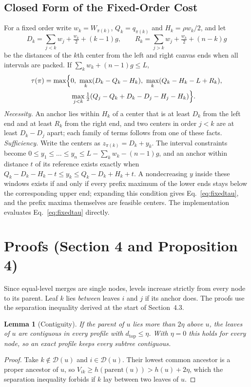 \documentclass[preprint]{vgtc}
\newtheorem{lemma}{Lemma}
\newcommand{\dtop}{d_{\mathrm{top}}}
\begin{document}
\subsection{Closed Form of the Fixed-Order Cost}\label{sec:tau}
For a fixed order write $w_k=W_{\pi(k)}$, $Q_k=q_{\pi(k)}$ and $H_k=\rho w_k/2$, and let
\begin{equation*}
D_k=\sum_{j<k}w_j+\tfrac{w_k}{2}+(k-1)g,\qquad R_k=\sum_{j>k}w_j+\tfrac{w_k}{2}+(n-k)g
\end{equation*}
be the distances of the $k$th center from the left and right canvas ends when all intervals are packed. If $\sum_kw_k+(n-1)g\le L$,
\begin{equation}\label{eq:fixedtau}
\begin{split}
\tau(\pi)=\max\Bigl\{&0,\ \max_k(D_k-Q_k-H_k),\ \max_k(Q_k-H_k-L+R_k),\\
&\max_{j<k}\tfrac12(Q_j-Q_k+D_k-D_j-H_j-H_k)\Bigr\}.
\end{split}
\end{equation}
\emph{Necessity.} An anchor lies within $H_k$ of a center that is at least $D_k$ from the left end and at least $R_k$ from the right end, and two centers in order $j<k$ are at least $D_k-D_j$ apart; each family of terms follows from one of these facts. \emph{Sufficiency.} Write the centers as $z_{\pi(k)}=D_k+y_k$. The interval constraints become $0\le y_1\le\dots\le y_n\le L-\sum_kw_k-(n-1)g$, and an anchor within distance $t$ of its reference exists exactly when $Q_k-D_k-H_k-t\le y_k\le Q_k-D_k+H_k+t$. A nondecreasing $y$ inside these windows exists if and only if every prefix maximum of the lower ends stays below the corresponding upper end; expanding this condition gives Eq.~\ref{eq:fixedtau}, and the prefix maxima themselves are feasible centers. The implementation evaluates Eq.~\ref{eq:fixedtau} directly.

\section{Proofs (Section 4 and Proposition 4)}\label{sec:proofs}
Since equal-level merges are single nodes, levels increase strictly from every node to its parent. Leaf $k$ lies \emph{between} leaves $i$ and $j$ if its anchor does. The proofs use the separation inequality derived at the start of Section~4.3.

\begin{lemma}[Contiguity]\label{lem:contig}
If the parent of $u$ lies more than $2\eta$ above $u$, the leaves of $u$ are contiguous in every profile with $\dtop\le\eta$. With $\eta=0$ this holds for every node, so an exact profile keeps every subtree contiguous.
\end{lemma}
\begin{proof}
Take $k\notin\mathcal D(u)$ and $i\in\mathcal D(u)$. Their lowest common ancestor is a proper ancestor of $u$, so $V_{ik}\ge h(\mathrm{parent}(u))>h(u)+2\eta$, which the separation inequality forbids if $k$ lay between two leaves of $u$.
\end{proof}
\end{document}
